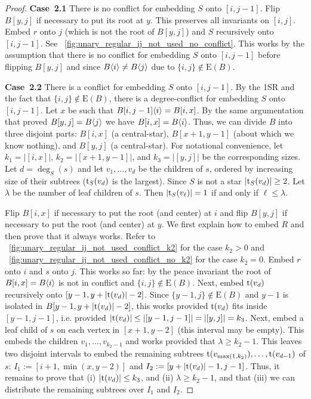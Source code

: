 \documentclass[11pt,a4paper,colorlinks=true,urlcolor=blue,citecolor=red]{article}
\theoremstyle{plain}
\newcommand{\case}[1]{\par\vspace{.5\baselineskip}\noindent\textbf{\sffamily Case~#1}}
\newcommand{\EB}{\mathrm{E}(B)}
\begin{document}
\begin{proof}
  \case{2.1} There is no conflict for embedding $S$ onto $[i,j-1]$.
  Flip $B[y,j]$ if necessary to put its root at $y$. This preserves
  all invariants on $[i,j]$. Embed $r$ onto $j$ (which is not the root
  of $B[y,j]$) and $S$ recursively onto $[i,j-1]$. See
  \figurename~\ref{fig:unary_regular_ij_not_used_no_conflict}. This
  works by the assumption that there is no conflict for embedding
  $S$ onto $[i,j-1]$ before flipping $B[y,j]$ and since
  $B\langle{i}\rangle\neq B\langle{j}\rangle$ due to $\{i,j\}\not\in\EB$.

  \case{2.2} There is a conflict for embedding $S$ onto $[i,j-1]$.  By
  the 1SR and the fact that $\{i,j\}\not\in\EB$, there is a
  degree-conflict for embedding $S$ onto $[i,j-1]$. Let $x$ be such that
  $B{[i,j-1]}\langle{i}\rangle=B[i,x]$. By the same argumentation that proved
  $B[y,j]=B\langle{j}\rangle$ we have $B[i,x]=B\langle{i}\rangle$. Thus, we can divide
  $B$ into three disjoint parts: $B[i,x]$ (a central-star),
  $B[x+1,y-1]$ (about which we know nothing), and $B[y,j]$ (a
  central-star). For notational convenience, let $k_1=|[i,x]|$,
  $k_2=|[x+1,y-1]|$, and $k_3=|[y,j]|$ be the corresponding sizes. Let
  $d=\deg_S(s)$ and let $v_1,\dots,v_d$ be the children of $s$, ordered
  by increasing size of their subtrees ($\mathrm t_S(v_d)$ is the largest).
  Since $S$ is not a star $|\mathrm t_S(v_d)|\geq 2$. Let $\lambda$ be the
  number of leaf children of $s$. Then $|\mathrm t_S(v_\ell)|=1$ if and only if
  $\ell\leq\lambda$.

  Flip $B[i,x]$ if necessary to put the root (and center) at $i$ and
  flip $B[y,j]$ if necessary to put the root (and center) at $y$. We
  first explain how to embed $R$ and then prove that it always works.
  Refer to \figurename~\ref{fig:unary_regular_ij_not_used_conflict_k2}
  for the case $k_2>0$ and
  \figurename~\ref{fig:unary_regular_ij_not_used_conflict_no_k2} for the
  case $k_2=0$. Embed $r$ onto $i$ and $s$ onto $j$. This works so far:
  by the peace invariant the root of $B[i,x]=B\langle{i}\rangle$ is not
  in conflict and $\{i,j\}\not\in\EB$. Next, embed $\mathrm t(v_d)$
  recursively onto $[y-1,y+|\mathrm t(v_d)|-2]$. Since
  $\{y-1,j\}\not\in\EB$ and $y-1$ is isolated in
  $B[y-1,y+|\mathrm t(v_d)|-2]$, this works provided $\mathrm t(v_d)$ fits inside
  $[y-1,j-1]$, i.e. provided $|\mathrm t(v_d)|\leq |[y-1,j-1]|=|[y,j]|=k_3$.
  Next, embed a leaf child of $s$ on each vertex in $[x+1,y-2]$ (this
  interval may be empty). This embeds the children $v_1,\dots,v_{k_2-1}$
  and works provided that $\lambda\geq k_2-1$. This leaves two disjoint
  intervals to embed the remaining subtrees
  $\mathrm t(v_{\max(1,k_2)}),\dots,\mathrm t(v_{d-1})$ of $s$:
  $I_1:=[i+1,\min(x,y-2)]$ and $I_2:=[y+|\mathrm t(v_d)|-1,j-1]$. Thus, it
  remains to prove that (i) $|\mathrm t(v_d)|\leq k_3$, and (ii) $\lambda\geq
  k_2-1$, and that (iii) we can distribute the remaining subtrees over
  $I_1$ and $I_2$.


\end{proof}
\end{document}
